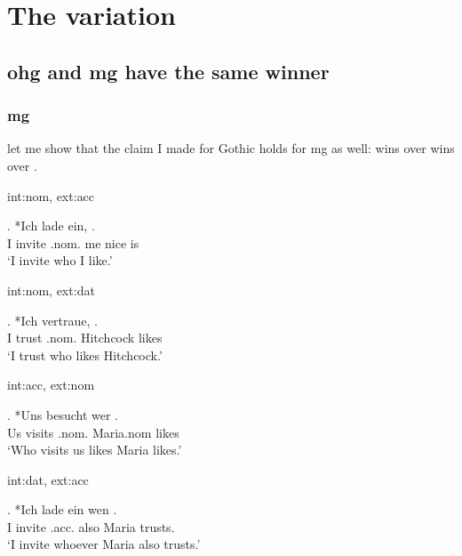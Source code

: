 
\chapter{The variation}

\section{\ac{ohg} and \ac{mg} have the same winner}

\subsection{\ac{mg}}

let me show that the claim I made for Gothic holds for \ac{mg} as well:  wins over  wins over .

\ac{int}:\ac{nom}, \ac{ext}:\ac{acc}

\exg. *Ich {lade ein},    .\\
 I invite\scsub{[acc]} .\ac{nom}. me nice is\scsub{[nom]}\\
 `I invite who I like.' 

\ac{int}:\ac{nom}, \ac{ext}:\ac{dat}

\exg. *Ich vertraue,   .\\
 I trust\scsub{[dat]} .\ac{nom}. Hitchcock likes\scsub{[nom]}\\
 `I trust who likes Hitchcock.' 

\ac{int}:\ac{acc}, \ac{ext}:\ac{nom}

 \exg. *Uns besucht wer  .\\
  Us visits\scsub{[nom]} .\ac{nom}. Maria.\ac{nom} likes\scsub{[acc]}\\
  `Who visits us likes Maria likes.' 

\ac{int}:\ac{dat}, \ac{ext}:\ac{acc}

 \exg. *Ich {lade ein} wen   . \\
  I invite\scsub{[acc]} .\ac{acc}. also Maria trusts\scsub{[dat]}.\\
  `I invite whoever Maria also trusts.' 

